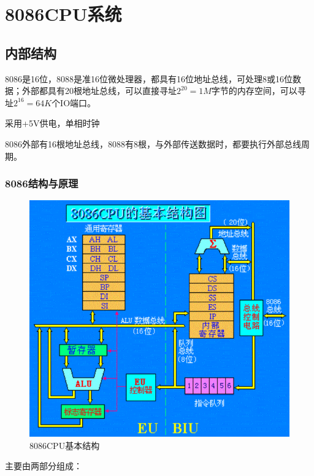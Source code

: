 \section{8086CPU系统}
\subsection{内部结构}
8086是16位，8088是准16位微处理器，都具有16位地址总线，可处理8或16位数据；外部都具有20根地址总线，可以直接寻址$2^{20}=1M$字节的内存空间，可以寻址$2^{16}=64K$个IO端口。

采用+5V供电，单相时钟

8086外部有16根地址总线，8088有8根，与外部传送数据时，都要执行外部总线周期。
\subsubsection{8086结构与原理}
\begin{figure}[H]
    \centering
    \includegraphics[scale=1]{part_8086CPU/part_8086CPU_pic/8086CPU基本结构.png}
    \caption{8086CPU基本结构}
\end{figure}
主要由两部分组成：

